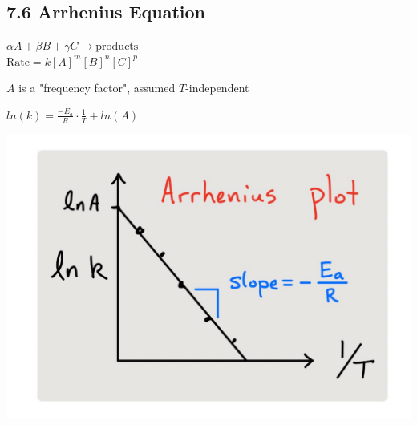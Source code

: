 \subsection{7.6 Arrhenius Equation}
    \vspace*{0.5em}
    $\alpha A + \beta B + \gamma C \longrightarrow \text{products}$\\
    $\text{Rate} = k[A]^m [B]^n [C]^p$


    $A$ is a "frequency factor", assumed $T$-independent
    \vspace*{0.5em}

    \begin{minipage}{0.99\linewidth}
        \begin{minipage}{0.49\linewidth}
            \centerline{$ln(k) = \frac{-E_a}{R} \cdot \frac{1}{T} + ln(A)$}
        \end{minipage}
        \begin{minipage}{0.49\linewidth}
            \centerline{\includegraphics[width=0.8\linewidth]{src/7_Kinetics/images/arrhenius_plot.pdf}}
        \end{minipage}
    \end{minipage}